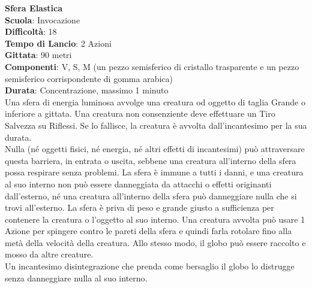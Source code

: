 \begin{multicols}{2}
\medskip\textbf{Sfera Elastica}\\
\textbf{Scuola}: Invocazione\\
\textbf{Difficoltà}:  18\\
\textbf{Tempo di Lancio}: 2 Azioni\\
\textbf{Gittata}: 90 metri\\
\textbf{Componenti}: V, S, M (un pezzo semisferico di cristallo trasparente e un pezzo semisferico corrispondente di gomma arabica)\\
\textbf{Durata}: Concentrazione, massimo 1 minuto\\
Una sfera di energia luminosa avvolge una creatura od oggetto di taglia Grande o inferiore a gittata. Una creatura non consenziente deve effettuare un Tiro Salvezza su Riflessi. Se lo fallisce, la creatura è avvolta dall'incantesimo per la sua durata.\\
Nulla (né oggetti fisici, né energia, né altri effetti di incantesimi) può attraversare questa barriera, in entrata o uscita, sebbene una creatura all'interno della sfera possa respirare senza problemi. La sfera è immune a tutti i danni, e una creatura al suo interno non può essere danneggiata da attacchi o effetti originanti dall'esterno, né una creatura all'interno della sfera può danneggiare nulla che si trovi all'esterno. La sfera è priva di peso e grande giusto a sufficienza per contenere la creatura o l’oggetto al suo interno. Una creatura avvolta può usare 1 Azione per spingere contro le pareti della sfera e quindi farla rotolare fino alla metà della velocità della creatura. Allo stesso modo, il globo può essere raccolto e mosso da altre creature.\\
Un incantesimo disintegrazione che prenda come bersaglio il globo lo distrugge senza danneggiare nulla al suo interno.


\end{multicols}
